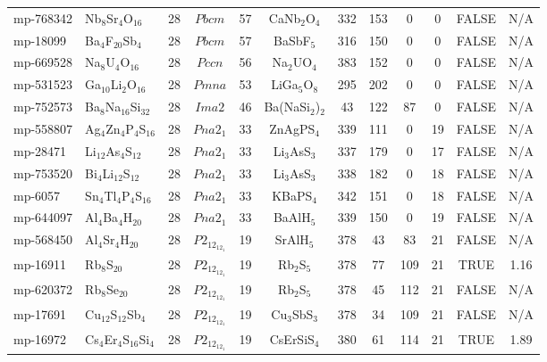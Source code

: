 {\begin{longtable}{llcccccccccc}
    mp-768342 & Nb$_{8}$Sr$_{4}$O$_{16}$ & 28    & $Pbcm$ & 57    & CaNb$_{2}$O$_{4}$ & 332   & 153   & 0     & 0     & FALSE & N/A \\
    mp-18099 & Ba$_{4}$F$_{20}$Sb$_{4}$ & 28    & $Pbcm$ & 57    & BaSbF$_{5}$ & 316   & 150   & 0     & 0     & FALSE & N/A \\
    mp-669528 & Na$_{8}$U$_{4}$O$_{16}$ & 28    & $Pccn$ & 56    & Na$_{2}$UO$_{4}$ & 383   & 152   & 0     & 0     & FALSE & N/A \\
    mp-531523 & Ga$_{10}$Li$_{2}$O$_{16}$ & 28    & $Pmna$ & 53    & LiGa$_{5}$O$_{8}$ & 295   & 202   & 0     & 0     & FALSE & N/A \\
    mp-752573 & Ba$_{8}$Na$_{16}$Si$_{32}$ & 28    & $Ima2$ & 46    & Ba(NaSi$_{2}$)$_{2}$ & 43    & 122   & 87    & 0     & FALSE & N/A \\
    mp-558807 & Ag$_{4}$Zn$_{4}$P$_{4}$S$_{16}$ & 28    & $Pna2_1$ & 33    & ZnAgPS$_{4}$ & 339   & 111   & 0     & 19    & FALSE & N/A \\
    mp-28471 & Li$_{12}$As$_{4}$S$_{12}$ & 28    & $Pna2_1$ & 33    & Li$_{3}$AsS$_{3}$ & 337   & 179   & 0     & 17    & FALSE & N/A \\
    mp-753520 & Bi$_{4}$Li$_{12}$S$_{12}$ & 28    & $Pna2_1$ & 33    & Li$_{3}$AsS$_{3}$ & 338   & 182   & 0     & 18    & FALSE & N/A \\
    mp-6057 & Sn$_{4}$Tl$_{4}$P$_{4}$S$_{16}$ & 28    & $Pna2_1$ & 33    & KBaPS$_{4}$ & 342   & 151   & 0     & 18    & FALSE & N/A \\
    mp-644097 & Al$_{4}$Ba$_{4}$H$_{20}$ & 28    & $Pna2_1$ & 33    & BaAlH$_{5}$ & 339   & 150   & 0     & 19    & FALSE & N/A \\
    mp-568450 & Al$_{4}$Sr$_{4}$H$_{20}$ & 28    & $P2_12_12_1$ & 19    & SrAlH$_{5}$ & 378   & 43    & 83    & 21    & FALSE & N/A \\
    mp-16911 & Rb$_{8}$S$_{20}$ & 28    & $P2_12_12_1$ & 19    & Rb$_{2}$S$_{5}$ & 378   & 77    & 109   & 21    & TRUE  & 1.16  \\
    mp-620372 & Rb$_{8}$Se$_{20}$ & 28    & $P2_12_12_1$ & 19    & Rb$_{2}$S$_{5}$ & 378   & 45    & 112   & 21    & FALSE & N/A \\
    mp-17691 & Cu$_{12}$S$_{12}$Sb$_{4}$ & 28    & $P2_12_12_1$ & 19    & Cu$_{3}$SbS$_{3}$ & 378   & 34    & 109   & 21    & FALSE & N/A \\
    mp-16972 & Cs$_{4}$Er$_{4}$S$_{16}$Si$_{4}$ & 28    & $P2_12_12_1$ & 19    & CsErSiS$_{4}$ & 380   & 61    & 114   & 21    & TRUE  & 1.89  \\

\end{longtable}}
